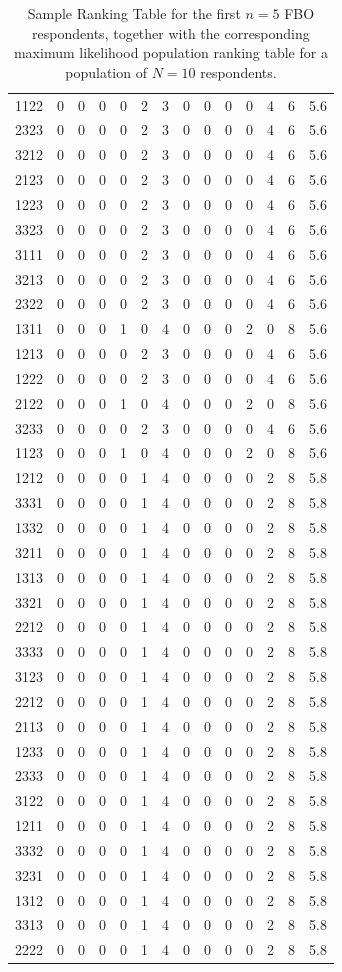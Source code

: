 \documentclass[a4paper, 12pt]{article}
\begin{document}
\begin{table}[!htpb]
\begin{tabular}{c|cccccc|cccccc|c}
1122& 0&0&0&0&2&3&0&0&0&0&4&6&5.6\\
2323& 0&0&0&0&2&3&0&0&0&0&4&6&5.6\\
3212& 0&0&0&0&2&3&0&0&0&0&4&6&5.6\\
2123& 0&0&0&0&2&3&0&0&0&0&4&6&5.6\\
1223& 0&0&0&0&2&3&0&0&0&0&4&6&5.6\\
3323& 0&0&0&0&2&3&0&0&0&0&4&6&5.6\\
3111& 0&0&0&0&2&3&0&0&0&0&4&6&5.6\\
3213& 0&0&0&0&2&3&0&0&0&0&4&6&5.6\\
2322& 0&0&0&0&2&3&0&0&0&0&4&6&5.6\\
1311& 0&0&0&1&0&4&0&0&0&2&0&8&5.6\\
1213& 0&0&0&0&2&3&0&0&0&0&4&6&5.6\\
1222& 0&0&0&0&2&3&0&0&0&0&4&6&5.6\\
2122& 0&0&0&1&0&4&0&0&0&2&0&8&5.6\\
3233& 0&0&0&0&2&3&0&0&0&0&4&6&5.6\\
1123& 0&0&0&1&0&4&0&0&0&2&0&8&5.6\\
1212& 0&0&0&0&1&4&0&0&0&0&2&8&5.8\\
3331& 0&0&0&0&1&4&0&0&0&0&2&8&5.8\\
1332& 0&0&0&0&1&4&0&0&0&0&2&8&5.8\\
3211& 0&0&0&0&1&4&0&0&0&0&2&8&5.8\\
1313& 0&0&0&0&1&4&0&0&0&0&2&8&5.8\\
3321& 0&0&0&0&1&4&0&0&0&0&2&8&5.8\\
2212& 0&0&0&0&1&4&0&0&0&0&2&8&5.8\\
3333& 0&0&0&0&1&4&0&0&0&0&2&8&5.8\\
3123& 0&0&0&0&1&4&0&0&0&0&2&8&5.8\\
2212& 0&0&0&0&1&4&0&0&0&0&2&8&5.8\\
2113& 0&0&0&0&1&4&0&0&0&0&2&8&5.8\\
1233& 0&0&0&0&1&4&0&0&0&0&2&8&5.8\\
2333& 0&0&0&0&1&4&0&0&0&0&2&8&5.8\\
3122& 0&0&0&0&1&4&0&0&0&0&2&8&5.8\\
1211& 0&0&0&0&1&4&0&0&0&0&2&8&5.8\\
3332& 0&0&0&0&1&4&0&0&0&0&2&8&5.8\\
3231& 0&0&0&0&1&4&0&0&0&0&2&8&5.8\\
1312& 0&0&0&0&1&4&0&0&0&0&2&8&5.8\\
3313& 0&0&0&0&1&4&0&0&0&0&2&8&5.8\\
2222& 0&0&0&0&1&4&0&0&0&0&2&8&5.8\\


\end{tabular}
\caption{{\small Sample Ranking Table for the first $n=5$ FBO respondents, together with the corresponding maximum likelihood population ranking table for a population of $N=10$ respondents.}   }
\label{Tab13}
\end{table}            
\end{document}
